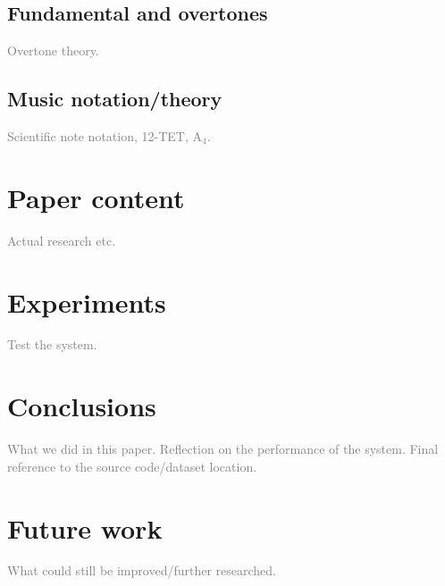 \documentclass[10pt,twocolumn]{article}
\newcommand{\note}[2]{#1${}_#2$}
\begin{document}
\subsection{Fundamental and overtones}
\textcolor{gray}{Overtone theory.}

\subsection{Music notation/theory}
\textcolor{gray}{Scientific note notation, 12-TET, \note{A}{4}.}


\section{Paper content}
\textcolor{gray}{Actual research etc.}


\section{Experiments}  \label{sec:exp}
\textcolor{gray}{Test the system.}


\section{Conclusions}
\textcolor{gray}{What we did in this paper. Reflection on the performance of the system. Final reference to the source code/dataset location.}


\section{Future work}  \label{sec:future}
\textcolor{gray}{What could still be improved/further researched.}





\end{document}
